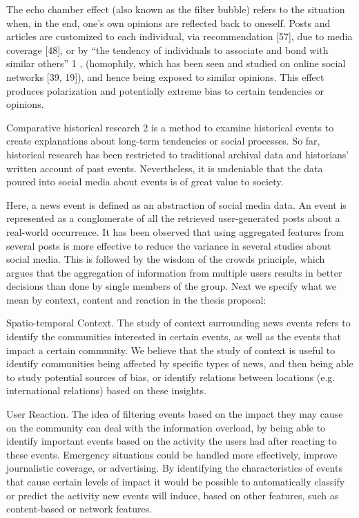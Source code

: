 \begin{intro}
The echo chamber effect (also known as the filter bubble) refers to the
situation when, in the end, one’s own opinions are reflected back to oneself.
Posts and articles are customized to each individual, via recommendation [57],
due to media coverage [48], or by “the tendency of individuals to associate and
bond with similar others” 1 , (homophily, which has been seen and studied on
online social networks [39, 19]), and hence being exposed to similar opinions.
This effect produces polarization and potentially extreme bias to certain
tendencies or opinions. 


Comparative historical research 2 is a method to examine
historical events to create explanations about long-term tendencies or social
processes. So far, historical research has been restricted to traditional
archival data and historians’ written account of past events. Nevertheless, it
is undeniable that the data poured into social media about events is of great
value to society.







Here, a news event is defined as an abstraction of social media data. An event
is represented as a conglomerate of all the retrieved user-generated posts about
a real-world occurrence. It has been observed that using aggregated features
from several posts is more effective to reduce the variance in several studies
about social media. This is followed by the wisdom of the crowds principle,
which argues that the aggregation of information from multiple users results in
better decisions than done by single members of the group. Next we specify what
we mean by context, content and reaction in the thesis proposal:

Spatio-temporal Context. The study of context surrounding news events refers to
identify the communities interested in certain events, as well as the events
that impact a certain community. We believe that the study of context is useful
to identify communities being affected by specific types of news, and then being
able to study potential sources of bias, or identify relations between locations
(e.g. international relations) based on these insights. 

User Reaction. The idea of filtering events based on the impact they may cause
on the community can deal with the information overload, by being able to
identify important events based on the activity the users had after reacting to
these events. Emergency situations could be handled more effectively, improve
journalistic coverage, or advertising. By identifying the characteristics of
events that cause certain levels of impact it would be possible to automatically
classify or predict the activity new events will induce, based on other
features, such as content-based or network features. 


\end{intro}
